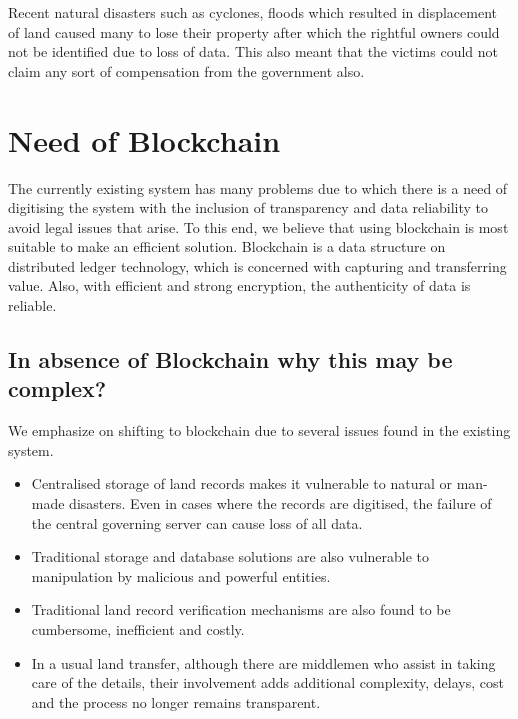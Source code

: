 \documentclass[conference]{IEEEtran}
\begin{document}
Recent natural disasters such as cyclones, floods which resulted in displacement of land caused many to lose their property after which the rightful owners could not be identified due to loss of data. This also meant that the victims could not claim any sort of compensation from the government also.

\section{Need of Blockchain} 
The currently existing system has many problems due to which there is a need of digitising the system with the inclusion of transparency and data reliability to avoid legal issues that arise. To this end, we believe that using blockchain is most suitable to make an efficient solution. Blockchain is a data structure on distributed ledger technology, which is concerned with capturing and transferring value. Also, with efficient and strong encryption, the authenticity of data is reliable.

\subsection{In absence of Blockchain why this may be complex?}
We emphasize on shifting to blockchain due to several issues found in the existing system.
\begin{itemize}
    \item Centralised storage of land records makes it vulnerable to natural or man-made disasters. Even in cases where the records are digitised, the failure of the central governing server can cause loss of all data.
    \item Traditional storage and database solutions are also vulnerable to manipulation by malicious and powerful entities.
    \item Traditional land record verification mechanisms are also found to be cumbersome, inefficient and costly.
    \item In a usual land transfer, although there are middlemen who assist in taking care of the details, their involvement adds additional complexity, delays, cost and the process no longer remains transparent.
\end{itemize}
\end{document}
